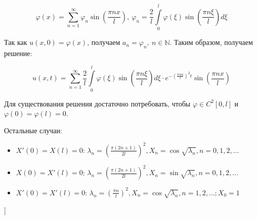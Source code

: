 $$\varphi(x) = \displaystyle\sum_{n=1}^{\infty} \varphi_n \sin(\frac{\pi n x}{l}),~\varphi_n=\frac{2}{l}\int\limits_0^l\varphi(\xi)\sin(\frac{\pi n \xi}{l})d\xi$$

Так как $u(x,0) = \varphi(x)$, получаем $a_n = \varphi_n,~n\in\mathbb{N}$. Таким образом, получаем решение:

$$u(x,t)=
\displaystyle\sum_{n=1}^{\infty} \frac{2}{l}\int\limits_0^l\varphi(\xi)\sin \left( \frac{\pi n \xi}{l} \right)d\xi \cdot e^{-(\frac{\pi n a}{l})^2t} \sin \left(\frac{\pi n x}{l} \right)$$

\bigbreak
Для существования решения достаточно потребовать, чтобы $\varphi\in C^2[0,l]$ и $\varphi(0)=\varphi(l)=0$.

\bigbreak
Остальные случаи:
\begin{itemize}
    \item $X'(0)=X(l)=0$: $\lambda_n=\left(\frac{\pi(2n+1)}{2l}\right)^2, X_n=\cos\sqrt{\lambda_n}, n=0,1,2,\dots$ \\
    \item $X(0)=X'(l)=0$: $\lambda_n=\left(\frac{\pi(2n+1)}{2l}\right)^2, X_n=\sin\sqrt{\lambda_n}, n=0,1,2,\dots$ \\
    \item $X'(0)=X'(l)=0$: $\lambda_n=\left(\frac{\pi n}{l}\right)^2, X_n=\cos\sqrt{\lambda_n}, n=1,2,\dots; X_0=1$ \\
\end{itemize}

\bigbreak
[\cite[page 200-202]{urmati_tikhonov}]